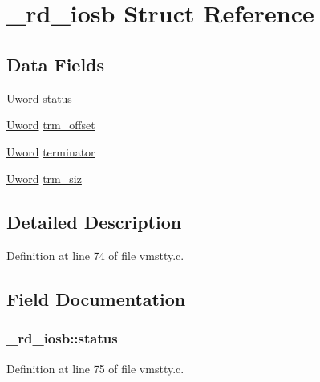 \hypertarget{struct__rd__iosb}{\section{\+\_\+rd\+\_\+iosb Struct Reference}
\label{struct__rd__iosb}
}
\subsection*{Data Fields}
\begin{DoxyCompactItemize}
\item 
\hyperlink{vmstty_8c_a6124fd8a90b8b651aacc9d98026ad4e4}{Uword} \hyperlink{struct__rd__iosb_a99d1c8ba0fd28fed9346d207b15bc575}{status}
\item 
\hyperlink{vmstty_8c_a6124fd8a90b8b651aacc9d98026ad4e4}{Uword} \hyperlink{struct__rd__iosb_a696589b1e1c424c40236ec56eb772013}{trm\+\_\+offset}
\item 
\hyperlink{vmstty_8c_a6124fd8a90b8b651aacc9d98026ad4e4}{Uword} \hyperlink{struct__rd__iosb_a9a563d5370747f6325699e23db4bf3cc}{terminator}
\item 
\hyperlink{vmstty_8c_a6124fd8a90b8b651aacc9d98026ad4e4}{Uword} \hyperlink{struct__rd__iosb_a10463708d782d828f44db79df8722725}{trm\+\_\+siz}
\end{DoxyCompactItemize}


\subsection{Detailed Description}


Definition at line 74 of file vmstty.\+c.



\subsection{Field Documentation}
\hypertarget{struct__rd__iosb_a99d1c8ba0fd28fed9346d207b15bc575}{
\subsubsection[{status}]{ \+\_\+rd\+\_\+iosb\+::status}}\label{struct__rd__iosb_a99d1c8ba0fd28fed9346d207b15bc575}


Definition at line 75 of file vmstty.\+c.




